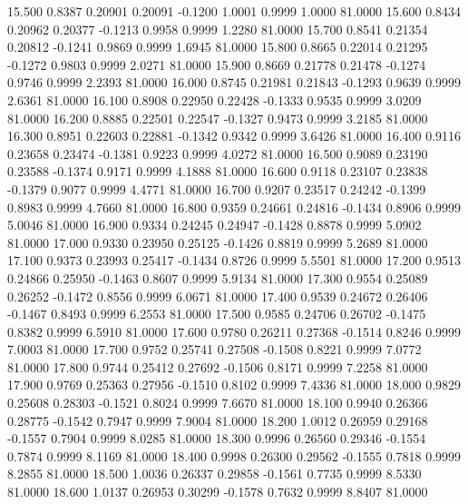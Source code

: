   15.500   0.8387   0.20901   0.20091  -0.1200   1.0001   0.9999   1.0000  81.0000
  15.600   0.8434   0.20962   0.20377  -0.1213   0.9958   0.9999   1.2280  81.0000
  15.700   0.8541   0.21354   0.20812  -0.1241   0.9869   0.9999   1.6945  81.0000
  15.800   0.8665   0.22014   0.21295  -0.1272   0.9803   0.9999   2.0271  81.0000
  15.900   0.8669   0.21778   0.21478  -0.1274   0.9746   0.9999   2.2393  81.0000
  16.000   0.8745   0.21981   0.21843  -0.1293   0.9639   0.9999   2.6361  81.0000
  16.100   0.8908   0.22950   0.22428  -0.1333   0.9535   0.9999   3.0209  81.0000
  16.200   0.8885   0.22501   0.22547  -0.1327   0.9473   0.9999   3.2185  81.0000
  16.300   0.8951   0.22603   0.22881  -0.1342   0.9342   0.9999   3.6426  81.0000
  16.400   0.9116   0.23658   0.23474  -0.1381   0.9223   0.9999   4.0272  81.0000
  16.500   0.9089   0.23190   0.23588  -0.1374   0.9171   0.9999   4.1888  81.0000
  16.600   0.9118   0.23107   0.23838  -0.1379   0.9077   0.9999   4.4771  81.0000
  16.700   0.9207   0.23517   0.24242  -0.1399   0.8983   0.9999   4.7660  81.0000
  16.800   0.9359   0.24661   0.24816  -0.1434   0.8906   0.9999   5.0046  81.0000
  16.900   0.9334   0.24245   0.24947  -0.1428   0.8878   0.9999   5.0902  81.0000
  17.000   0.9330   0.23950   0.25125  -0.1426   0.8819   0.9999   5.2689  81.0000
  17.100   0.9373   0.23993   0.25417  -0.1434   0.8726   0.9999   5.5501  81.0000
  17.200   0.9513   0.24866   0.25950  -0.1463   0.8607   0.9999   5.9134  81.0000
  17.300   0.9554   0.25089   0.26252  -0.1472   0.8556   0.9999   6.0671  81.0000
  17.400   0.9539   0.24672   0.26406  -0.1467   0.8493   0.9999   6.2553  81.0000
  17.500   0.9585   0.24706   0.26702  -0.1475   0.8382   0.9999   6.5910  81.0000
  17.600   0.9780   0.26211   0.27368  -0.1514   0.8246   0.9999   7.0003  81.0000
  17.700   0.9752   0.25741   0.27508  -0.1508   0.8221   0.9999   7.0772  81.0000
  17.800   0.9744   0.25412   0.27692  -0.1506   0.8171   0.9999   7.2258  81.0000
  17.900   0.9769   0.25363   0.27956  -0.1510   0.8102   0.9999   7.4336  81.0000
  18.000   0.9829   0.25608   0.28303  -0.1521   0.8024   0.9999   7.6670  81.0000
  18.100   0.9940   0.26366   0.28775  -0.1542   0.7947   0.9999   7.9004  81.0000
  18.200   1.0012   0.26959   0.29168  -0.1557   0.7904   0.9999   8.0285  81.0000
  18.300   0.9996   0.26560   0.29346  -0.1554   0.7874   0.9999   8.1169  81.0000
  18.400   0.9998   0.26300   0.29562  -0.1555   0.7818   0.9999   8.2855  81.0000
  18.500   1.0036   0.26337   0.29858  -0.1561   0.7735   0.9999   8.5330  81.0000
  18.600   1.0137   0.26953   0.30299  -0.1578   0.7632   0.9999   8.8407  81.0000
